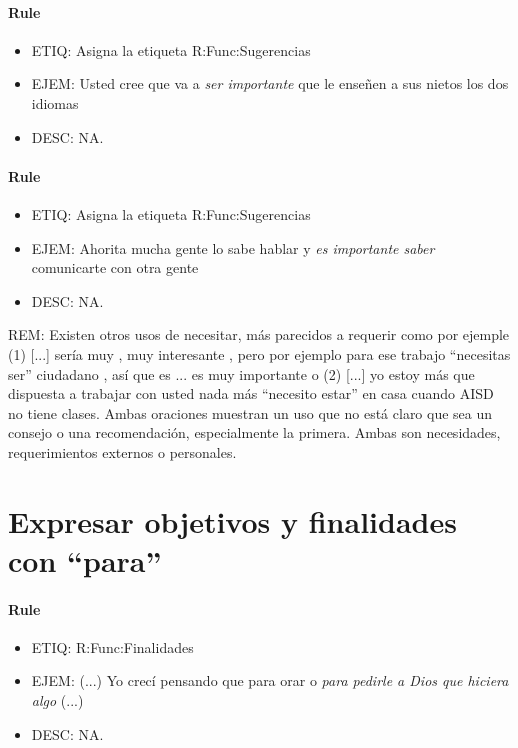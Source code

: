 \documentclass[11pt]{report}
\begin{document}
\paragraph*{Rule}
\begin{itemize}
\item ETIQ: Asigna la etiqueta R:Func:Sugerencias
\item EJEM: Usted cree que va a \emph{ser importante} que le enseñen a sus nietos los dos idiomas 
\item DESC: NA.
\end{itemize}

\paragraph*{Rule}
\begin{itemize}
\item ETIQ: Asigna la etiqueta R:Func:Sugerencias
\item EJEM: Ahorita mucha gente lo sabe hablar y \emph{es importante saber} comunicarte con otra gente
\item DESC: NA.
\end{itemize}

REM: Existen otros usos de necesitar, más parecidos a requerir como por ejemple (1)  [...] sería muy , muy interesante , pero por ejemplo para ese trabajo ``necesitas ser'' ciudadano , así que es ... es muy importante o (2) [...] yo estoy más que dispuesta a trabajar con usted nada más ``necesito estar'' en casa cuando AISD no tiene clases. Ambas oraciones muestran un uso que no está claro que sea un consejo o una recomendación, especialmente la primera. Ambas son necesidades, requerimientos externos o personales.
\section{Expresar objetivos y finalidades con ``para''}
\paragraph*{Rule}
\begin{itemize}
\item ETIQ: R:Func:Finalidades
\item EJEM: (...) Yo crecí pensando que para orar o \emph{para pedirle a Dios que hiciera algo} (...)
\item DESC: NA.
\end{itemize}
\end{document}
